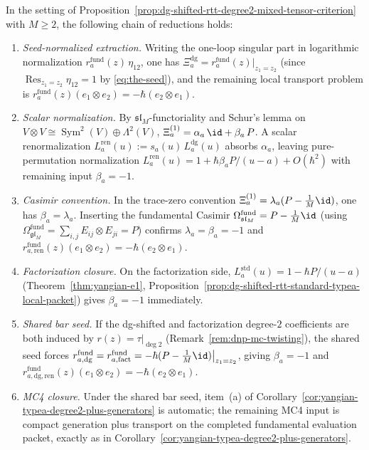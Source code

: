 \begin{proposition}
\label{prop:dg-shifted-rtt-seed-normalized-coefficient}
\label{prop:dg-shifted-rtt-degree2-scalar-normalization}
\label{prop:dg-shifted-rtt-degree2-casimir-normalization}
\label{prop:dg-shifted-rtt-degree2-fundamental-casimir}
\label{prop:factorization-fundamental-casimir-identity}
\label{prop:dg-shifted-factorization-shared-seed}
\label{prop:yangian-typea-dg-local-closure}
In the setting of
Proposition~\ref{prop:dg-shifted-rtt-degree2-mixed-tensor-criterion}
with $M\ge2$, the following chain of reductions holds:
\begin{enumerate}[label=\textup{(\roman*)}]
\item \emph{Seed-normalized extraction.}
 Writing the one-loop singular part in logarithmic normalization
 $r_a^{\mathrm{fund}}(z)\,\eta_{12}$, one has
 $\Xi_a^{\mathrm{dg}}=r_a^{\mathrm{fund}}(z)\big|_{z_1=z_2}$
 (since $\operatorname*{Res}_{z_1=z_2}\eta_{12}=1$
 by \eqref{eq:the-seed}), and the remaining local transport problem is
 $r_a^{\mathrm{fund}}(z)(e_1\otimes e_2)=-\hbar(e_2\otimes e_1)$.
\item \emph{Scalar normalization.}
 By $\mathfrak{sl}_M$-functoriality and Schur's lemma on
 $V\otimes V\cong\operatorname{Sym}^2(V)\oplus\Lambda^2(V)$,
 $\Xi_a^{(1)}=\alpha_a\,\id+\beta_a\,P$. A scalar renormalization
 $L_a^{\mathrm{ren}}(u):=s_a(u)\,L_a^{\mathrm{dg}}(u)$ absorbs
 $\alpha_a$, leaving pure-permutation normalization
 $L_a^{\mathrm{ren}}(u)=1+\hbar\beta_a P/(u-a)+O(\hbar^2)$ with
 remaining input $\beta_a=-1$.
\item \emph{Casimir convention.}
 In the trace-zero convention
 $\Xi_a^{(1)}=\lambda_a(P-\frac{1}{M}\id)$, one has
 $\beta_a=\lambda_a$. Inserting the fundamental Casimir
 $\Omega_{\mathfrak{sl}_M}^{\mathrm{fund}}=P-\frac{1}{M}\id$
 (using $\Omega_{\mathfrak{gl}_M}^{\mathrm{fund}}
 =\sum_{i,j}E_{ij}\otimes E_{ji}=P$) confirms
 $\lambda_a=\beta_a=-1$ and
 $r_{a,\mathrm{ren}}^{\mathrm{fund}}(z)(e_1\otimes e_2)
 =-\hbar(e_2\otimes e_1)$.
\item \emph{Factorization closure.}
 On the factorization side,
 $L_a^{\mathrm{std}}(u)=1-\hbar P/(u-a)$
 (Theorem~\ref{thm:yangian-e1},
 Proposition~\ref{prop:dg-shifted-rtt-standard-typea-local-packet})
 gives $\beta_a=-1$ immediately.
\item \emph{Shared bar seed.}
 If the dg-shifted and factorization degree-$2$ coefficients are both
 induced by $r(z)=\tau|_{\deg 2}$
 (Remark~\ref{rem:dnp-mc-twisting}), the shared seed forces
 $r_{a,\mathrm{dg}}^{\mathrm{fund}}
 =r_{a,\mathrm{fact}}^{\mathrm{fund}}
 =-\hbar(P-\frac{1}{M}\id)\big|_{z_1=z_2}$, giving $\beta_a=-1$ and
 $r_{a,\mathrm{dg,ren}}^{\mathrm{fund}}(z)(e_1\otimes e_2)
 =-\hbar(e_2\otimes e_1)$.
\item \emph{MC4 closure.}
 Under the shared bar seed, item~\textup{(a)} of
 Corollary~\ref{cor:yangian-typea-degree2-plus-generators} is
 automatic; the remaining MC4 input is compact generation plus
 transport on the completed fundamental evaluation packet, exactly as
 in Corollary~\ref{cor:yangian-typea-degree2-plus-generators}.
\end{enumerate}
\end{proposition}

